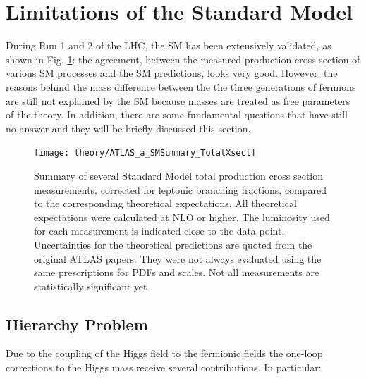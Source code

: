 	\section{Limitations of the Standard Model}
	\label{sec:SMlim}

		During Run 1 and 2 of the LHC, the SM has been extensively validated, as shown in Fig. \ref{fig:ATLAS_a_SMSummary_TotalXsect}: the agreement, between the measured production cross section of various SM processes and the SM predictions, looks very good. However, the reasons behind the mass difference between the the three generations of fermions are still not explained by the SM because masses are treated as free parameters of the theory. In addition, there are some fundamental questions that have still no answer and they will be briefly discussed this section.

		\begin{figure}[!htb]
			\centering
			\texttt{[image: theory/ATLAS\_a\_SMSummary\_TotalXsect]}
			\caption{\label{fig:ATLAS_a_SMSummary_TotalXsect} Summary of several Standard Model total production cross section measurements, corrected for leptonic branching fractions, compared to the corresponding theoretical expectations. All theoretical expectations were calculated at NLO or higher. The luminosity used for each measurement is indicated close to the data point. Uncertainties for the theoretical predictions are quoted from the original ATLAS papers. They were not always evaluated using the same prescriptions for PDFs and scales. Not all measurements are statistically significant yet \cite{ATLAS_a_SMSummary_TotalXsect}.}
		\end{figure}



		\subsection*{Hierarchy Problem}

			Due to the coupling of the Higgs field to the fermionic fields the one-loop corrections to the Higgs mass receive several contributions. In particular: 



